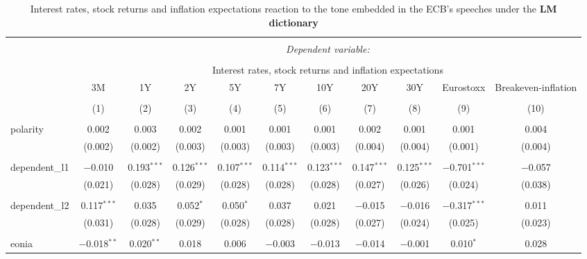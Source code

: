 
\begin{table}[!htbp] \centering 
  \caption [LM Tone \& Interest Rates, Stock Returns, Inflation Expectations: all speeches]{Interest rates, stock returns and inflation expectations reaction to the tone embedded in the ECB's speeches under the \textbf{LM dictionary}} 
  \label{tab:assets_all_lm} 
  \begin{adjustbox}{width=1.25\textwidth}
\begin{tabular}{@{\extracolsep{5pt}}lcccccccccc} 
\\[-1.8ex]\hline 
\hline \\[-1.8ex] 
 & \multicolumn{10}{c}{\textit{Dependent variable:}} \\ 
\cline{2-11} 
\\[-1.8ex] & \multicolumn{10}{c}{Interest rates, stock returns and inflation expectations} \\ 
 & 3M & 1Y & 2Y & 5Y & 7Y & 10Y & 20Y & 30Y & Eurostoxx & Breakeven-inflation \\ 
\\[-1.8ex] & (1) & (2) & (3) & (4) & (5) & (6) & (7) & (8) & (9) & (10)\\ 
\hline \\[-1.8ex] 
 polarity & 0.002 & 0.003 & 0.002 & 0.001 & 0.001 & 0.001 & 0.002 & 0.001 & 0.001 & 0.004 \\ 
  & (0.002) & (0.002) & (0.003) & (0.003) & (0.003) & (0.003) & (0.004) & (0.004) & (0.001) & (0.004) \\ 
  & & & & & & & & & & \\ 
 dependent\_l1 & $-$0.010 & 0.193$^{***}$ & 0.126$^{***}$ & 0.107$^{***}$ & 0.114$^{***}$ & 0.123$^{***}$ & 0.147$^{***}$ & 0.125$^{***}$ & $-$0.701$^{***}$ & $-$0.057 \\ 
  & (0.021) & (0.028) & (0.029) & (0.028) & (0.028) & (0.028) & (0.027) & (0.026) & (0.024) & (0.038) \\ 
  & & & & & & & & & & \\ 
 dependent\_l2 & 0.117$^{***}$ & 0.035 & 0.052$^{*}$ & 0.050$^{*}$ & 0.037 & 0.021 & $-$0.015 & $-$0.016 & $-$0.317$^{***}$ & 0.011 \\ 
  & (0.031) & (0.028) & (0.029) & (0.028) & (0.028) & (0.028) & (0.027) & (0.024) & (0.025) & (0.023) \\ 
  & & & & & & & & & & \\ 
 eonia & $-$0.018$^{**}$ & 0.020$^{**}$ & 0.018 & 0.006 & $-$0.003 & $-$0.013 & $-$0.014 & $-$0.001 & 0.010$^{*}$ & 0.028 \\ 

\end{tabular}
\end{adjustbox}
\end{table}
